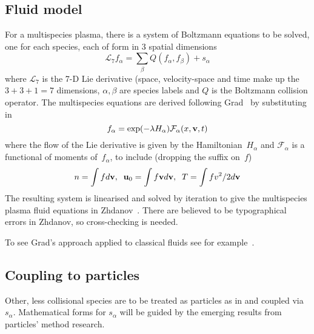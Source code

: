 \subsection{Fluid model}\label{sec:fluid1D}
For a multispecies plasma,
there is a system of Boltzmann equations to be solved, one for each species, each of form in
$3$ spatial dimensions
\begin{equation}\label{eq:mboltz}
\mathcal{L}_7 f_\alpha = \sum_\beta Q(f_\alpha, f_\beta) +s_\alpha
\end{equation}
where $\mathcal{L}_7$ is the  7-D Lie derivative (space, velocity-space and time make up the
$3+3+1=7$ dimensions, $\alpha,\beta$ are species labels and $Q$ is the Boltzmann collision operator.
The multispecies equations are derived following Grad~\cite[\S\,6]{zhdanov}
by substituting in 
\begin{equation}\label{eq:ifaexpan}
f_\alpha=\exp(-\lambda H_\alpha) \mathcal{F}_\alpha (x,{\bf v},t)
\end{equation}
where the flow of the Lie derivative is given by the Hamiltonian~$H_\alpha$
and $\mathcal{F}_\alpha$ is a functional of moments of~$f_\alpha$, to include
(dropping the suffix on~$f$)
\begin{equation}\label{eq:moments}
n=\int f d{\bf v},\;\; {\bf u}_0 = \int f {\bf v} d{\bf v},\;\; 
T=\int f v^2/2 d{\bf v}
\end{equation}
The resulting system is linearised and solved by iteration to give the multispecies
plasma fluid equations in Zhdanov~\cite[\S\,6]{zhdanov}. There are believed to be
typographical errors in Zhdanov, so cross-checking is needed.

To see Grad's approach applied to classical fluids see
for example~\cite[\S\,8]{thompson}.

\subsection{Coupling to particles}\label{sec:coupart1D}
Other, less collisional species are to be treated as particles as in  and
coupled via~$s_\alpha$. Mathematical forms for $s_\alpha$ will be guided by 
the emerging results from particles' method research.
